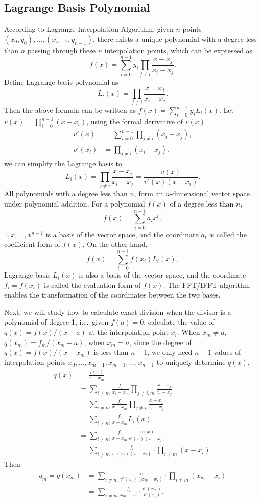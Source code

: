 \subsection{Lagrange Basis Polynomial}

According to Lagrange Interpolation Algorithm, given $n$ points $(x_0,y_0),\ldots,(x_{n-1},y_{n-1})$, there exists a unique polynomial with a degree less than $n$ passing through these $n$ interpolation points, which can be expressed as
\[ f(x) = \sum_{i=0}^{n-1} y_i \prod_{j \ne i} \frac{x-x_j}{x_i-x_j}. \]
Define Lagrange basis polynomial as
\[ L_i(x) = \prod_{j \ne i} \frac{x-x_j}{x_i-x_j}. \]
Then the above formula can be written as $f(x)=\sum_{i=0}^{n-1}y_iL_i(x)$. Let $v(x)=\prod_{i=0}^{n-1}(x-x_i)$, using the formal derivative of $v(x)$
\begin{align*}
    v'(x) &= \sum_{i=0}^{n-1}\prod_{j \ne i}(x_i-x_j), \\
    v'(x_i) &= \prod_{j \ne i}(x_i-x_j).
\end{align*}
we can simplify the Lagrange basis to
\[ L_i(x) = \prod_{j \ne i}\frac{x-x_j}{x_i-x_j} = \frac{v(x)}{v'(x)(x-x_i)}. \]
All polynomials with a degree less than $n$, form an $n$-dimensional vector space under polynomial addition. For a polynomial $f(x)$ of a degree less than $n$, \[ f(x) = \sum_{i=0}^{n-1} a_ix^i, \]
$1,x,\ldots,x^{n-1}$ is a basis of the vector space, and the coordinate $a_i$ is called the coefficient form of $f(x)$. On the other hand, \[ f(x) = \sum_{i=0}^{n-1}f(x_i)L_i(x), \]
Lagrange basis $L_i(x)$ is also a basis of the vector space, and the coordinate $f_i=f(x_i)$ is called the evaluation form of $f(x)$.
The FFT/IFFT algorithm enables the transformation of the coordinates between the two bases.

Next, we will study how to calculate exact division when the divisor is a polynomial of degree 1, i.e.\ given $f(a)=0$, calculate the value of $q(x)=f(x)/(x-a)$ at the interpolation point $x_i$.
When $x_m \ne a$, $q(x_m)=f_m/(x_m-a)$, when $x_m=a$, since the degree of $q(x)=f(x)/(x-x_m)$ is less than $n-1$, we only need $n-1$ values of interpolation points $x_0,\ldots,x_{m-1} ,x_{m+1},\ldots,x_{n-1}$ to uniquely determine $q(x)$.
\begin{align*}
    q(x) &= \frac{f(x)}{x-x_m} \\
    &= \sum_{i \ne m} \frac{f_i}{x_i-x_m} \prod_{j \ne i,m} \frac{x-x_j}{x_i-x_j} \\
    &= \sum_{i \ne m} \frac{f_i}{x-x_m} \prod_{j \ne i} \frac{x-x_j}{x_i-x_j} \\
    &= \sum_{i \ne m} \frac{f_i}{x-x_m} L_i(x) \\
    &= \sum_{i \ne m} \frac{f_i}{x-x_m} \frac{v(x)}{v'(x)(x-x_i)} \\
    &= \sum_{i \ne m} \frac{f_i}{v'(x_i)(x-x_i)} \cdot \prod_{i \ne m}(x-x_i).
\end{align*}
Then
\begin{align*}
    q_m = q(x_m) &= \sum_{i \ne m} \frac{f_i}{v'(x_i)(x_m-x_i)} \cdot \prod_{i \ne m}(x_m-x_i) \\
    &= \sum_{i \ne m} \frac{f_i}{x_m-x_i} \cdot \frac{v'(x_m)}{v'(x_i)}.
\end{align*}

